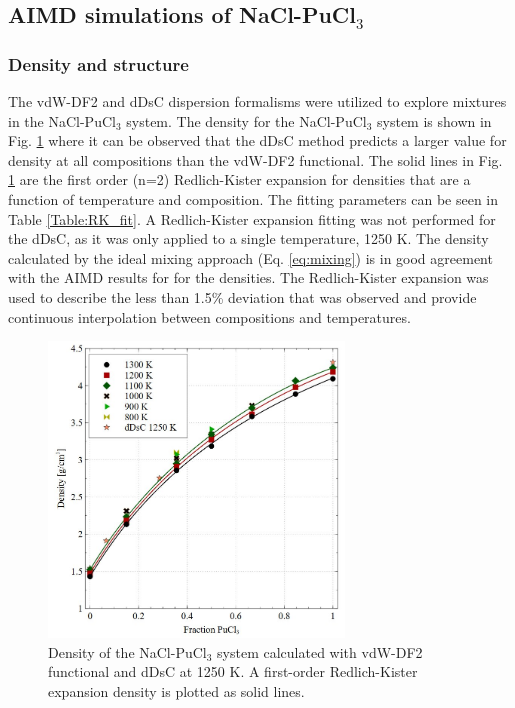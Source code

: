 \documentclass[review]{elsarticle}
\begin{document}
\subsection{AIMD simulations of NaCl-PuCl$_3$}
\subsubsection{Density and structure}
The vdW-DF2 and dDsC dispersion formalisms were utilized to explore mixtures in the NaCl-PuCl$_3$ system. The density for the NaCl-PuCl$_3$ system is shown in Fig. \ref{fig:density} where it can be observed that the dDsC method predicts a larger value for density at all compositions than the vdW-DF2 functional. The solid lines in Fig. \ref{fig:density} are the first order (n=2) Redlich-Kister expansion for densities that are a function of temperature and composition. The fitting parameters can be seen in Table \ref{Table:RK_fit}. A Redlich-Kister expansion fitting was not performed for the dDsC, as it was only applied to a single temperature, 1250 K. The density calculated by the ideal mixing approach (Eq. \ref{eq:mixing}) is in good agreement with the AIMD results for for the densities. The Redlich-Kister expansion was used to describe the less than 1.5\% deviation that was observed and provide continuous interpolation between compositions and temperatures.
\begin{figure}[h!]
 \centering
 \includegraphics[width=0.7\textwidth]{density.jpg} 
 \caption{Density of the NaCl-PuCl$_3$ system calculated with vdW-DF2 functional and dDsC at 1250 K. A first-order Redlich-Kister expansion density is plotted as solid lines.}
 \label{fig:density}
\end{figure}
\end{document}
